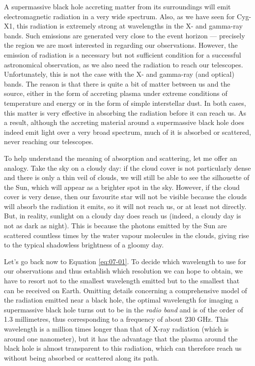 A supermassive black hole accreting matter from its surroundings will emit
electromagnetic radiation in a very wide spectrum.
Also, as we have seen for Cyg-X1, this radiation is extremely strong at wavelengths in
the X- and gamma-ray bands. Such emissions are generated very close to the event horizon
--- precisely the region we are most interested in regarding our observations. However,
the emission of radiation is a necessary but not sufficient condition for a successful
astronomical observation, as we also need the radiation to reach our telescopes.
Unfortunately, this is not the case with the X- and gamma-ray (and optical) bands. The
reason is that there is quite a bit of matter between us and the source, either in the
form of accreting plasma under extreme conditions of temperature and
energy or in the form of simple interstellar dust. In both cases, this matter is very
effective in absorbing the radiation before it can reach us. As a result, although the
accreting material around a supermassive black hole does indeed emit light over a very
broad spectrum, much of it is absorbed or scattered, never reaching
our telescopes.

To help understand the meaning of absorption and scattering, let me offer an analogy.
Take the sky on a cloudy day: if the cloud cover is not particularly dense and there is
only a thin veil of clouds, we will still be able to see the silhouette of the Sun,
which will appear as a brighter spot in the sky. However, if the cloud cover is very
dense, then our favourite star will not be visible because the clouds will absorb the
radiation it emits, so it will not reach us, or at least not directly. But, in reality,
sunlight on a cloudy day does reach us (indeed, a cloudy day is not as dark as night).
This is because the photons emitted by the Sun are scattered countless times by the
water vapour molecules in the clouds, giving rise to the typical
shadowless brightness of a gloomy day.

Let's go back now to Equation \eqref{eq:07-01}. To decide which wavelength to use for our
observations and thus establish which resolution we can hope to obtain, we have to
resort not to the smallest wavelength emitted but to the smallest that can be received
on Earth. Omitting details concerning a comprehensive model of the radiation emitted
near a black hole, the optimal wavelength for imaging a supermassive black hole turns
out to be in the \emph{radio band} and is of the order of 1.3 millimetres, thus
corresponding to a frequency of about 230 GHz. This wavelength is a million times longer
than that of X-ray radiation (which is around one nanometer), but it
has the advantage that the plasma around the black hole is almost transparent to this
radiation, which can therefore reach us without being absorbed or scattered along its
path.

